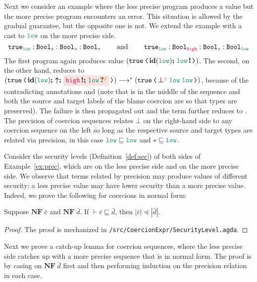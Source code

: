 \begin{example}
\label{ex:prec-error}
\normalfont

Next we consider an example where the less precise program produces a
value but the more precise program encounters an error. This situation
is allowed by the gradual guarantee, but the opposite one is not. We
extend the example with a cast to $\low$ on the more precise side.
\[
\true_{\low} : \Bool_{\unk} : \Bool_{\unk} : \Bool_{\unk}
\qquad\text{ and }\qquad
\true_{\low} : \Bool_{\high} : \Bool_{\unk} : \Bool_{\low}
\]
The first program again produces value $(\cccast{\true}{\id{\low}\seq\inj{\low}})$.
The second, on the other hand, reduces to
$(\cccast{\true}{\id{\low} \seq \up \seq \highlightred{\inj{\high} \seq \proj{\low}{p}}}) \longrightarrow^{*}
(\cccast{\true}{\err{\low}{\low}{p}})$, because of the contradicting
annotations \high and \low (note that \high is in the middle of the sequence and both the
source and target labels of the blame coercion are \low so that types are preserved).
The failure is then propagated out and the term further reduces to .
The precision of coercion sequences relates $\boldsymbol{\bot}$ on the right-hand side
to any coercion sequence on the left so long as the respective source and target types are
related via precision, in this case $\low \sqsubseteq \low$ and $\unk \sqsubseteq \low$.
\end{example}

Consider the security levels (Definition~\ref{def:sec}) of both sides
of Example~\ref{ex:prec}, which are \low on the less precise side and
\high on the more precise side.
We observe that \Surface terms related by precision may produce
values of different security: a less precise value may have lower
security than a more precise value. Indeed, we prove the following for
coercions in normal form:

\begin{lemma}
\label{lem:prec-sec}
Suppose $\mathbf{NF}\; \bar{c}$ and $\mathbf{NF}\; \bar{d}$. If $\vdash \bar{c} \sqsubseteq \bar{d}$, then $| \bar{c} | \preccurlyeq | \bar{d} |$.
\end{lemma}
\begin{proof}
  The proof is mechanized in \texttt{/src/CoercionExpr/SecurityLevel.agda}.
\end{proof}

Next we prove a catch-up lemma for coercion sequences, where the less
precise side catches up with a more precise sequence that is in normal
form. The proof is by casing on $\mathbf{NF}\;\bar{d}$ first and then
performing induction on the precision relation in each case.

